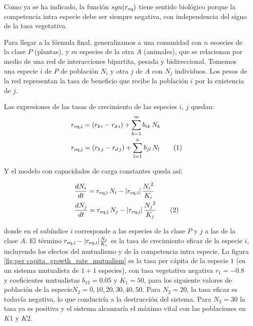 Como ya se ha indicado, la función $sgn(r_{\rm{eq}})$ tiene sentido biológico porque la competencia intra especie debe ser siempre negativa, con independencia del signo de la tasa vegetativa.

Para llegar a la fórmula final, generalizamos a una comunidad con $n$ esoecies de la clase $P$ (plantas), y $m$ especies de la otra $A$ (animales), que se relacionan por medio de una red de interacciones bipartita, pesada y bidireccional. Tomemos una especie $i$ de $P$ de población $N_i$ y otra $j$ de $A$ con $N_j$ individuos. Los pesos de la red representan la tasa de beneficio que recibe la población $i$ por la existencia de $j$. 

Las expresiones de las tasas de crecimiento de las especies $i$, $j$ quedan:
\begin{align*}
\displaystyle & r_{\rm{eq},i}  = \left( r_{b\, i} - r_{d\, i} \right) + \sum\limits_{k=1}^{m} b_{ik}\, N_k  \\
\displaystyle & r_{\rm{eq},j}  = \left( r_{b\, j} - r_{d\, j} \right) + \sum\limits_{l=1}^{n} b_{jl}\, N_l
\stepcounter{equation}\tag{\theequation}\label{modelors}
\end{align*}

Y el modelo con capacidades de carga constantes queda así:

\begin{theo}
\begin{align*}
\displaystyle
&\frac{dN_i}{dt}=r_{\rm{eq},i}\, N_i - |r_{\rm{eq},i}| \, \frac{{N_i}^2}{K_i}  \\
\displaystyle
&\frac{dN_j}{dt}=r_{\rm{eq},j} \, N_j - |r_{\rm{eq},j}| \, \frac{{N_j}^2}{K_j}
\stepcounter{equation}\tag{\theequation}\label{eq:modelo_optionI}
\end{align*}
\end{theo}

\noindent donde en el subíndice $i$ corresponde a las especies de la clase $P$ y $j$ a las de la clase $A$. El término $r_{\rm{eq},i} - |r_{\rm{eq},i}| \frac{N_i}{K_i}$ es la tasa de crecimiento eficaz de la especie $i$, incluyendo los efectos del mutualismo y de la competencia intra especie. La figura \ref{fig:per capita_growth_rate_mutualism} es la tasa per cápita de la especie $1$ (en un sistema mutualista de $1+1$ especies),
con tasa vegetativa negativa $r_1=-0.8$ y coeficientes mutualistas $b_{12}=0.05$ y $K_1=50$, para los siguiente valores de población de la especie$N_2=0,10,20,30,40,50$. Para $N_2=20$, la tasa eficaz es todavía negativa, lo que conduciría a la destrucción del sistema. Para
$N_2=30$ la tasa ya es positiva y el sistema alcanzaría el máximo vital con las poblaciones en $K1$ y $K2$.

